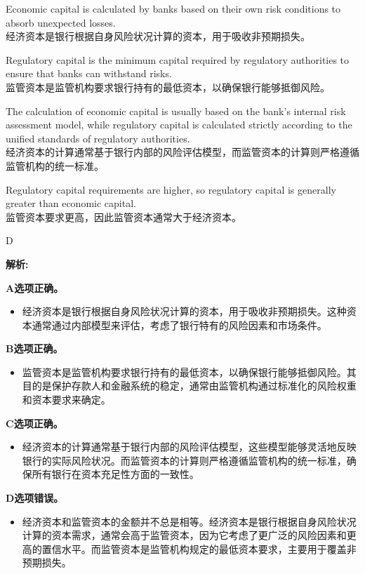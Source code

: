 \documentclass{article}
\newenvironment{explanation}
{\textbf{解析:}\par}
{\par}
\begin{document}
\begin{choices}
    \item Economic capital is calculated by banks based on their own risk conditions to absorb unexpected losses. \\
    经济资本是银行根据自身风险状况计算的资本，用于吸收非预期损失。
    \item Regulatory capital is the minimum capital required by regulatory authorities to ensure that banks can withstand risks. \\
    监管资本是监管机构要求银行持有的最低资本，以确保银行能够抵御风险。
    \item The calculation of economic capital is usually based on the bank's internal risk assessment model, while regulatory capital is calculated strictly according to the unified standards of regulatory authorities. \\
    经济资本的计算通常基于银行内部的风险评估模型，而监管资本的计算则严格遵循监管机构的统一标准。
    \item Regulatory capital requirements are higher, so regulatory capital is generally greater than economic capital.\\
    监管资本要求更高，因此监管资本通常大于经济资本。
\end{choices}

\begin{correctanswer}
    D
\end{correctanswer}

\begin{explanation}
    \textbf{A选项正确。}
    \begin{itemize}
        \item 经济资本是银行根据自身风险状况计算的资本，用于吸收非预期损失。这种资本通常通过内部模型来评估，考虑了银行特有的风险因素和市场条件。
    \end{itemize}

    \textbf{B选项正确。}
    \begin{itemize}
        \item 监管资本是监管机构要求银行持有的最低资本，以确保银行能够抵御风险。其目的是保护存款人和金融系统的稳定，通常由监管机构通过标准化的风险权重和资本要求来确定。
    \end{itemize}

    \textbf{C选项正确。}
    \begin{itemize}
        \item 经济资本的计算通常基于银行内部的风险评估模型，这些模型能够灵活地反映银行的实际风险状况。而监管资本的计算则严格遵循监管机构的统一标准，确保所有银行在资本充足性方面的一致性。
    \end{itemize}

    \textbf{D选项错误。}
    \begin{itemize}
        \item 经济资本和监管资本的金额并不总是相等。经济资本是银行根据自身风险状况计算的资本需求，通常会高于监管资本，因为它考虑了更广泛的风险因素和更高的置信水平。而监管资本是监管机构规定的最低资本要求，主要用于覆盖非预期损失。
    \end{itemize}
\end{explanation}
\end{document}
